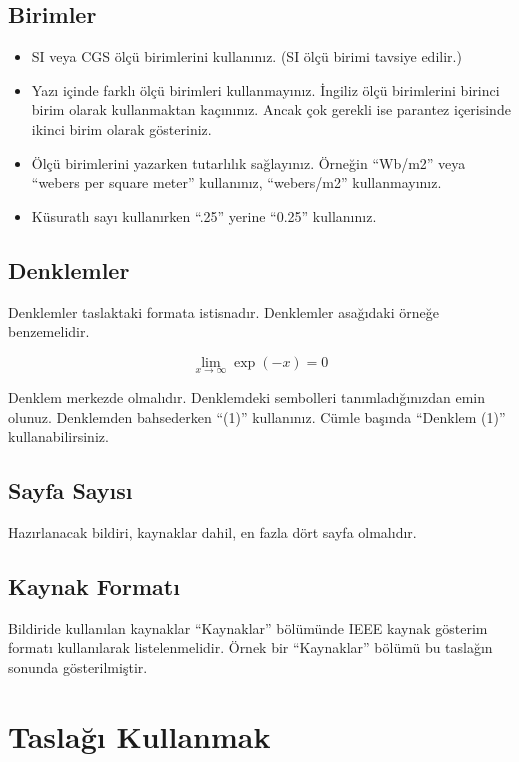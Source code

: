 \documentclass[conference]{IEEEtran}
\begin{document}
\subsection{Birimler}

\begin{itemize}
\item SI veya CGS ölçü birimlerini kullanınız. (SI ölçü birimi tavsiye edilir.)
\item Yazı içinde farklı ölçü birimleri kullanmayınız. İngiliz ölçü birimlerini birinci birim olarak kullanmaktan kaçınınız. Ancak çok gerekli ise parantez içerisinde ikinci birim olarak gösteriniz.
\item Ölçü birimlerini yazarken tutarlılık sağlayınız. Örneğin “Wb/m2” veya “webers per square meter” kullanınız, “webers/m2” kullanmayınız.
\item Küsuratlı sayı kullanırken “.25” yerine “0.25” kullanınız.
\end{itemize}

\subsection{Denklemler}

Denklemler taslaktaki formata istisnadır. Denklemler asağıdaki örneğe benzemelidir.

\begin{equation}
\lim_{x \to \infty} \exp(-x) = 0
\end{equation}

Denklem merkezde olmalıdır. Denklemdeki sembolleri tanımladığınızdan emin olunuz. Denklemden bahsederken “(1)” kullanınız. Cümle başında “Denklem (1)” kullanabilirsiniz.

\subsection{Sayfa Sayısı}

Hazırlanacak bildiri, kaynaklar dahil, en fazla dört sayfa olmalıdır.

\subsection{Kaynak Formatı}

Bildiride kullanılan kaynaklar “Kaynaklar” bölümünde IEEE kaynak gösterim formatı kullanılarak listelenmelidir. Örnek bir “Kaynaklar” bölümü bu taslağın sonunda gösterilmiştir. 

\section{Taslağı Kullanmak}
\end{document}
